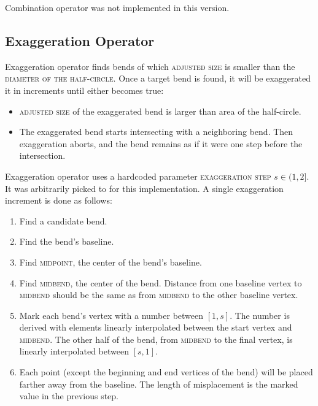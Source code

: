 \documentclass[a4paper]{article}
\begin{document}
Combination operator was not implemented in this version.

\subsection{Exaggeration Operator}

Exaggeration operator finds bends of which \textsc{adjusted size} is smaller
than the \textsc{diameter of the half-circle}. Once a target bend is found, it
will be exaggerated it in increments until either becomes true:

\begin{itemize}
    \item \textsc{adjusted size} of the exaggerated bend is larger than area of
        the half-circle.

    \item The exaggerated bend starts intersecting with a neighboring bend.
        Then exaggeration aborts, and the bend remains as if it were one step
        before the intersection.

\end{itemize}

Exaggeration operator uses a hardcoded parameter \textsc{exaggeration step} $s
\in (1,2]$. It was arbitrarily picked to {\exaggerationEnthusiasm} for this
implementation. A single exaggeration increment is done as follows:

\begin{enumerate}
    \item Find a candidate bend.
    \item Find the bend's baseline.
    \item Find \textsc{midpoint}, the center of the bend's baseline.

    \item Find \textsc{midbend}, the center of the bend. Distance from one
        baseline vertex to \textsc{midbend} should be the same as from
        \textsc{midbend} to the other baseline vertex.

    \item Mark each bend's vertex with a number between $[1,s]$. The number is
        derived with elements linearly interpolated between the start vertex
        and \textsc{midbend}. The other half of the bend, from \textsc{midbend}
        to the final vertex, is linearly interpolated between $[s,1]$.

    \item Each point (except the beginning and end vertices of the bend) will
        be placed farther away from the baseline. The length of misplacement is
        the marked value in the previous step.

\end{enumerate}
\end{document}
